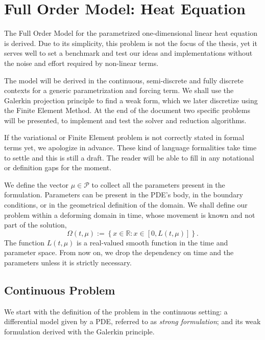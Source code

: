 \documentclass[../main.tex]{subfiles}
\begin{document}
\section{Full Order Model: Heat Equation}
\label{sec:1d_fom_heat_equation_full_order_model}
The Full Order Model for the parametrized one-dimensional linear heat equation is derived.
Due to its simplicity, this problem is not the focus of the thesis, yet it serves well to set a benchmark and test our ideas and implementations without the noise and effort required by non-linear terms.

The model will be derived in the continuous, semi-discrete and fully discrete contexts for a generic parametrization and forcing term.
We shall use the Galerkin projection principle to find a weak form, which we later discretize using the Finite Element Method. 
At the end of the document two specific problems will be presented, to implement and test the solver and reduction algorithms. 

If the variational or Finite Element problem is not correctly stated in formal terms yet, we apologize in advance.
These kind of language formalities take time to settle and this is still a draft. 
The reader will be able to fill in any notational or definition gaps for the moment. 

We define the vector $\mu \in \mathcal{P}$ to collect all the parameters present in the formulation.
Parameters can be present in the PDE's body, in the boundary conditions, or in the geometrical definition of the domain. 
We shall define our problem within a deforming domain in time, whose movement is known and not part of the solution,
\begin{equation*}
    \Omega(t, \mu) := \left\{x \in \mathbb{R} : x \in \left[0, L(t, \mu)\right]\right\}.
\end{equation*}
The function $L(t, \mu)$ is a real-valued smooth function in the time and parameter space.
From now on, we drop the dependency on time and the parameters unless it is strictly necessary. 

\subsection{Continuous Problem}
We start with the definition of the problem in the continuous setting: 
a differential model given by a PDE, referred to as \emph{strong formulation}; 
and its weak formulation derived with the Galerkin principle.
\end{document}
